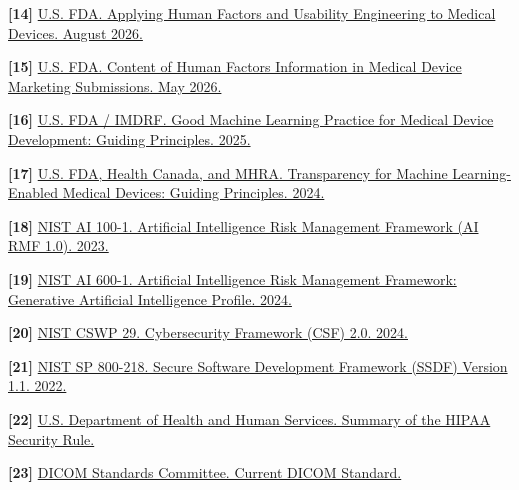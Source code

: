 \documentclass[11pt,letterpaper]{article}
\begin{document}
\textbf{[14] }\href{\detokenize{https://www.fda.gov/regulatory-information/search-fda-guidance-documents/applying-human-factors-and-usability-engineering-medical-devices}}{U.S. FDA. Applying Human Factors and Usability Engineering to Medical Devices. August 2026.}

\textbf{[15] }\href{\detokenize{https://www.fda.gov/regulatory-information/search-fda-guidance-documents/content-human-factors-information-medical-device-marketing-submissions}}{U.S. FDA. Content of Human Factors Information in Medical Device Marketing Submissions. May 2026.}

\textbf{[16] }\href{\detokenize{https://www.fda.gov/medical-devices/software-medical-device-samd/good-machine-learning-practice-medical-device-development-guiding-principles}}{U.S. FDA \slash\allowbreak{} IMDRF. Good Machine Learning Practice for Medical Device Development: Guiding Principles. 2025.}

\textbf{[17] }\href{\detokenize{https://www.fda.gov/medical-devices/software-medical-device-samd/transparency-machine-learning-enabled-medical-devices-guiding-principles}}{U.S. FDA, Health Canada, and MHRA. Transparency for Machine Learning-Enabled Medical Devices: Guiding Principles. 2024.}

\textbf{[18] }\href{\detokenize{https://www.nist.gov/publications/artificial-intelligence-risk-management-framework-ai-rmf-10}}{NIST AI 100-1. Artificial Intelligence Risk Management Framework (AI RMF 1.0). 2023.}

\textbf{[19] }\href{\detokenize{https://nvlpubs.nist.gov/nistpubs/ai/NIST.AI.600-1.pdf}}{NIST AI 600-1. Artificial Intelligence Risk Management Framework: Generative Artificial Intelligence Profile. 2024.}

\textbf{[20] }\href{\detokenize{https://www.nist.gov/publications/nist-cybersecurity-framework-csf-20}}{NIST CSWP 29. Cybersecurity Framework (CSF) 2.0. 2024.}

\textbf{[21] }\href{\detokenize{https://csrc.nist.gov/pubs/sp/800/218/final}}{NIST SP 800-218. Secure Software Development Framework (SSDF) Version 1.1. 2022.}

\textbf{[22] }\href{\detokenize{https://www.hhs.gov/hipaa/for-professionals/security/laws-regulations/index.html}}{U.S. Department of Health and Human Services. Summary of the HIPAA Security Rule.}

\textbf{[23] }\href{\detokenize{https://www.dicomstandard.org/current/}}{DICOM Standards Committee. Current DICOM Standard.}
\end{document}
